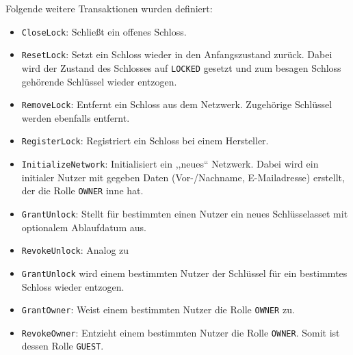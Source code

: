             \bigskip
            Folgende weitere Transaktionen wurden definiert:
            \begin{itemize}
                \item \colorbox{light-gray}{\lstinline{CloseLock}}: Schließt ein offenes Schloss.
                \item \colorbox{light-gray}{\lstinline{ResetLock}}: Setzt ein Schloss wieder in den Anfangszustand zurück.
                    Dabei wird der Zustand des Schlosses auf \colorbox{light-gray}{\lstinline{LOCKED}} gesetzt und zum besagen Schloss gehörende Schlüssel wieder entzogen.
                \item \colorbox{light-gray}{\lstinline{RemoveLock}}: Entfernt ein Schloss aus dem Netzwerk.
                    Zugehörige Schlüssel werden ebenfalls entfernt.
                \item \colorbox{light-gray}{\lstinline{RegisterLock}}: Registriert ein Schloss bei einem Hersteller. 
                \item \colorbox{light-gray}{\lstinline{InitializeNetwork}}: Initialisiert ein ,,neues`` Netzwerk.
                    Dabei wird ein initialer Nutzer mit gegeben Daten (Vor-/Nachname, E-Mailadresse) erstellt, der die Rolle \colorbox{light-gray}{\lstinline{OWNER}} inne hat.
                \item \colorbox{light-gray}{\lstinline{GrantUnlock}}: Stellt für bestimmten einen Nutzer ein neues Schlüsselasset mit optionalem Ablaufdatum aus. 
                \item \colorbox{light-gray}{\lstinline{RevokeUnlock}}: Analog zu \item \colorbox{light-gray}{\lstinline{GrantUnlock}} wird einem bestimmten Nutzer der Schlüssel für ein bestimmtes Schloss wieder entzogen.
                \item \colorbox{light-gray}{\lstinline{GrantOwner}}: Weist einem bestimmten Nutzer die Rolle \colorbox{light-gray}{\lstinline{OWNER}} zu.
                \item \colorbox{light-gray}{\lstinline{RevokeOwner}}: Entzieht einem bestimmten Nutzer die Rolle \colorbox{light-gray}{\lstinline{OWNER}}.
                Somit ist dessen Rolle \colorbox{light-gray}{\lstinline{GUEST}}.
            \end{itemize}
    
